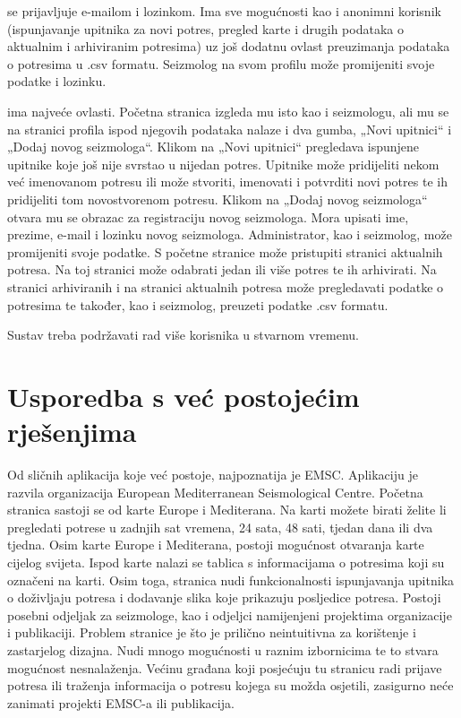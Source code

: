  se prijavljuje e-mailom i lozinkom. Ima sve mogućnosti kao i anonimni korisnik (ispunjavanje upitnika za novi potres, pregled karte i drugih podataka o aktualnim i arhiviranim potresima) uz još dodatnu ovlast preuzimanja podataka o potresima u .csv formatu. Seizmolog na svom profilu može promijeniti svoje podatke i lozinku.

 ima najveće ovlasti. Početna stranica izgleda mu isto kao i seizmologu, ali mu se na stranici profila ispod njegovih podataka nalaze i dva gumba, „Novi upitnici“ i „Dodaj novog seizmologa“. Klikom na „Novi upitnici“ pregledava ispunjene upitnike koje još nije svrstao u nijedan potres. Upitnike može pridijeliti nekom već imenovanom potresu ili može stvoriti, imenovati i potvrditi novi potres te ih pridijeliti tom novostvorenom potresu. Klikom na „Dodaj novog seizmologa“ otvara mu se obrazac za registraciju novog seizmologa. Mora upisati ime, prezime, e-mail i lozinku novog seizmologa. Administrator, kao i seizmolog, može promijeniti svoje podatke. S početne stranice može pristupiti stranici aktualnih potresa. Na toj stranici može odabrati jedan ili više potres te ih arhivirati. Na stranici arhiviranih i na stranici aktualnih potresa može pregledavati podatke o potresima te također, kao i seizmolog, preuzeti podatke .csv formatu.

Sustav treba podržavati rad više korisnika u stvarnom vremenu.\\



\section{Usporedba s već postojećim rješenjima}

{Od sličnih aplikacija koje već postoje, najpoznatija je EMSC. Aplikaciju je razvila organizacija European Mediterranean Seismological Centre. 
Početna stranica sastoji se od karte Europe i Mediterana. Na karti možete birati želite li pregledati potrese u zadnjih sat  vremena, 24 sata, 48 sati, tjedan dana ili dva tjedna. Osim karte Europe i Mediterana, postoji mogućnost otvaranja karte cijelog svijeta. 
Ispod karte nalazi se tablica s informacijama o potresima koji su označeni na karti. Osim toga, stranica nudi funkcionalnosti ispunjavanja upitnika o doživljaju potresa i dodavanje slika koje prikazuju posljedice potresa. Postoji posebni odjeljak za seizmologe, kao i odjeljci namijenjeni projektima organizacije i publikaciji. Problem stranice je što je prilično neintuitivna za korištenje i zastarjelog dizajna. Nudi mnogo mogućnosti u raznim izbornicima te to stvara mogućnost nesnalaženja. Većinu građana koji posjećuju tu stranicu radi prijave potresa ili traženja informacija o potresu kojega su možda osjetili, zasigurno neće zanimati projekti EMSC-a ili publikacija.}

